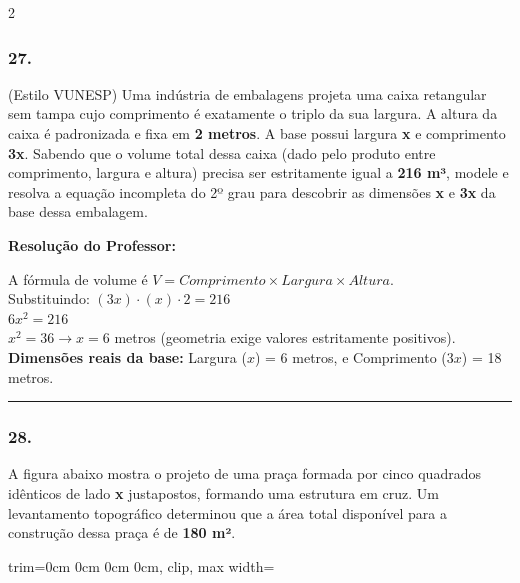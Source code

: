 \begin{multicols*}{2}
\subsubsection*{27.} (Estilo VUNESP) Uma indústria de embalagens projeta uma caixa retangular sem tampa cujo comprimento é exatamente o triplo da sua largura. A altura da caixa é padronizada e fixa em \textbf{2 metros}. A base possui largura \textbf{x} e comprimento \textbf{3x}. Sabendo que o volume total dessa caixa (dado pelo produto entre comprimento, largura e altura) precisa ser estritamente igual a \textbf{216 m³}, modele e resolva a equação incompleta do 2º grau para descobrir as dimensões \textbf{x} e \textbf{3x} da base dessa embalagem.

\ifgabarito
    \begin{tcolorbox}[colback=CorTitUm!5, colframe=CorTitUm, boxrule=1pt, arc=4pt, left=6pt, right=6pt, top=6pt, bottom=6pt]
    \small\textbf{\textcolor{CorTitUm}{Resolução do Professor:}}\par\vspace{0.1cm}
    \color{CinzaEscuro}
    A fórmula de volume é $V = Comprimento \times Largura \times Altura$.\\
    Substituindo: $(3x) \cdot (x) \cdot 2 = 216$\\
    $6x^2 = 216$\\
    $x^2 = 36 \rightarrow x = 6$ metros (geometria exige valores estritamente positivos).\\
    \textbf{Dimensões reais da base:} Largura ($x$) = 6 metros, e Comprimento ($3x$) = 18 metros.
    \end{tcolorbox}
\fi

\par\vspace{\espacoQuestao}

\noindent\textcolor{CorLinha}{\rule{\linewidth}{0.5pt}} 
\par\vspace{\espacoPreQuestao}
\subsubsection*{28.} A figura abaixo mostra o projeto de uma praça formada por cinco quadrados idênticos de lado \textbf{x} justapostos, formando uma estrutura em cruz. Um levantamento topográfico determinou que a área total disponível para a construção dessa praça é de \textbf{180 m²}.

\begin{center}
\begin{adjustbox}{trim=0cm 0cm 0cm 0cm, clip, max width=\larguraTikz}
\end{adjustbox}
\end{center}
\end{multicols*}
